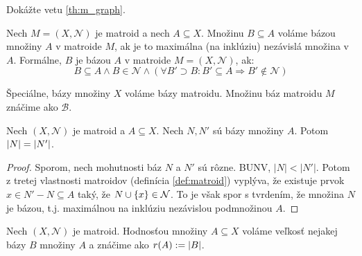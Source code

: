 \begin{exercise}
\label{ex:m_graph}
Dokážte vetu \ref{th:m_graph}.
\end{exercise}

\begin{definition}
Nech $M = (X, \mathcal{N})$ je matroid a nech $A \subseteq X$. Množinu $B \subseteq A$ voláme bázou množiny $A$ v matroide $M$, ak 
je to maximálna (na inklúziu) nezávislá množina v $A$. Formálne, $B$ je bázou $A$ v matroide $M=(X, \mathcal{N})$, ak:
$$B \subseteq A \wedge B \in \mathcal{N} \wedge \left( \forall B' \supset B: B' \subseteq A \Longrightarrow B' \not\in\mathcal{N} \right)$$

Špeciálne, bázy množiny $X$ voláme bázy matroidu. Množinu báz matroidu $M$ znáčime ako $\mathcal{B}$.
\end{definition}

\begin{theorem}
Nech $(X, \mathcal{N})$ je matroid a $A \subseteq X$. Nech $N, N'$ sú bázy množiny $A$. Potom $\left|N\right| = \left|N'\right|$.
\end{theorem}
\begin{proof}
Sporom, nech mohutnosti báz $N$ a $N'$ sú rôzne.
BUNV, $|N| < |N'|$.
Potom z tretej vlastnosti matroidov (definícia \ref{def:matroid}) vyplýva, že existuje prvok $x \in N' - N \subseteq A$ taký, že $N \cup \left\{x\right\} \in \mathcal{N}$.
To je však spor s tvrdením, že množina $N$ je bázou, t.j. maximálnou na inklúziu nezávislou podmnožinou $A$.
\end{proof}

\begin{definition}
Nech $(X, \mathcal{N})$ je matroid. Hodnosťou množiny $A \subseteq X$ voláme veľkosť nejakej bázy $B$ množiny $A$ a znáčime ako $r(A) := \left|B\right|$.
\end{definition}

